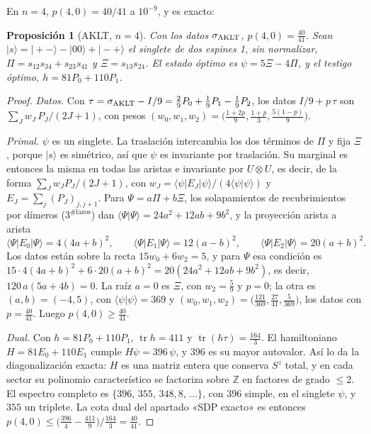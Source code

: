 \documentclass[11pt,a4paper]{article}
\newtheorem{proposicion}[teorema]{Proposición}
\theoremstyle{remark}
\newcommand{\tr}{\operatorname{tr}}
\newcommand{\ket}[1]{|#1\rangle}
\newcommand{\bra}[1]{\langle #1|}
\providecommand{\braket}[2]{\langle #1|#2\rangle}
\begin{document}
En $n=4$, $p(4,0)=40/41$ a $10^{-9}$, y es exacto:

\begin{proposicion}[AKLT, $n=4$]\label{prop:aklt4}
Con los datos $\sigma_{\rm AKLT}$, $p(4,0)=\tfrac{40}{41}$. Sean $\ket s=\ket{{+}{-}}-\ket{00}+\ket{{-}{+}}$
el singlete de dos espines 1, sin normalizar, $\Pi=s_{12}s_{34}+s_{23}s_{41}$ y $\Xi=s_{13}s_{24}$. El
estado óptimo es $\psi=5\Xi-4\Pi$, y el testigo óptimo, $h=81P_0+110P_1$.
\end{proposicion}

\begin{proof}
\emph{Datos.} Con $\tau=\sigma_{\rm AKLT}-I/9=\tfrac29P_0+\tfrac19P_1-\tfrac19P_2$, los datos
$I/9+p\,\tau$ son $\sum_Jw_J\,P_J/(2J+1)$, con pesos
$(w_0,w_1,w_2)=\big(\tfrac{1+2p}9,\tfrac{1+p}3,\tfrac{5(1-p)}9\big)$.

\emph{Primal.} $\psi$ es un singlete. La traslación intercambia los dos términos de $\Pi$ y fija
$\Xi$, porque $\ket s$ es simétrico, así que $\psi$ es invariante por traslación. Su marginal es
entonces la misma en todas las aristas e invariante por $U\otimes U$, es decir, de la forma
$\sum_Jw_JP_J/(2J+1)$, con $w_J=\bra\psi E_J\ket\psi/(4\braket{\psi}{\psi})$ y
$E_J=\sum_j(P_J)_{j,j+1}$. Para $\Psi=a\Pi+b\Xi$, los solapamientos de recubrimientos por dímeros
($3^{\#\text{lazos}}$) dan $\braket\Psi\Psi=24a^2+12ab+9b^2$, y la proyección arista a arista
\[
  \bra\Psi E_0\ket\Psi=4(4a+b)^2,\qquad\bra\Psi E_1\ket\Psi=12(a-b)^2,\qquad
  \bra\Psi E_2\ket\Psi=20(a+b)^2 .
\]
Los datos están sobre la recta $15w_0+6w_2=5$, y para $\Psi$ esa condición es
$15\cdot4(4a+b)^2+6\cdot20(a+b)^2=20(24a^2+12ab+9b^2)$, es decir, $120\,a(5a+4b)=0$. La raíz $a=0$
es $\Xi$, con $w_2=\tfrac59$ y $p=0$; la otra es $(a,b)=(-4,5)$, con $\braket\psi\psi=369$ y
$(w_0,w_1,w_2)=\big(\tfrac{121}{369},\tfrac{27}{41},\tfrac5{369}\big)$, los datos con
$p=\tfrac{40}{41}$. Luego $p(4,0)\ge\tfrac{40}{41}$.

\emph{Dual.} Con $h=81P_0+110P_1$, $\tr h=411$ y $\tr(h\tau)=\tfrac{164}3$. El hamiltoniano
$H=81E_0+110E_1$ cumple $H\psi=396\,\psi$, y $396$ es su mayor autovalor. Así lo da la
diagonalización exacta: $H$ es una matriz entera que conserva $S^z$ total, y en cada sector su
polinomio característico se factoriza sobre $\mathbb Z$ en factores de grado $\le2$. El espectro
completo es $\{396,\,355,\,348{,}8,\,\dots\}$, con $396$ simple, en el singlete $\psi$, y $355$ un
triplete. La cota dual del apartado «SDP exacto» es entonces
$p(4,0)\le\big(\tfrac{396}4-\tfrac{411}9\big)\big/\tfrac{164}3=\tfrac{40}{41}$.
\end{proof}
\end{document}
